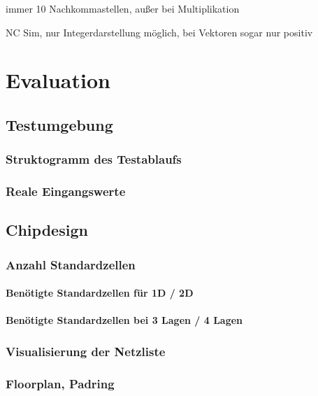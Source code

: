  immer 10 Nachkommastellen, außer bei Multiplikation
 
 NC Sim, nur Integerdarstellung möglich, bei Vektoren sogar nur positiv
 
 
 
 
  
 
 
 
 
  
 \chapter{Evaluation}
 


 \section{Testumgebung}
 \subsection{Struktogramm des Testablaufs}
 \subsection{Reale Eingangswerte}
 
 \section{Chipdesign}
 \subsection{Anzahl Standardzellen}
 \subsubsection{Benötigte Standardzellen für 1D / 2D}
 \subsubsection{Benötigte Standardzellen bei 3 Lagen / 4 Lagen}
 \subsection{Visualisierung der Netzliste}
 \subsection{Floorplan, Padring}
 
